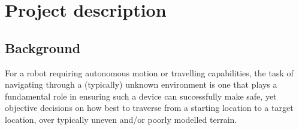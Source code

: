 \documentclass[10pt,fleqn,twoside]{article}
\begin{document}
\wordcount{}

\mmp

\setcounter{tocdepth}{3} %


\section{Project description}

\subsection{Background}

For a robot requiring autonomous motion or travelling capabilities, the task of navigating through a (typically) unknown environment is one that plays a fundamental role in ensuring such a device can successfully make safe, yet objective decisions on how best to traverse from a starting location to a target location, over typically uneven and/or poorly modelled terrain. \\

\end{document}

